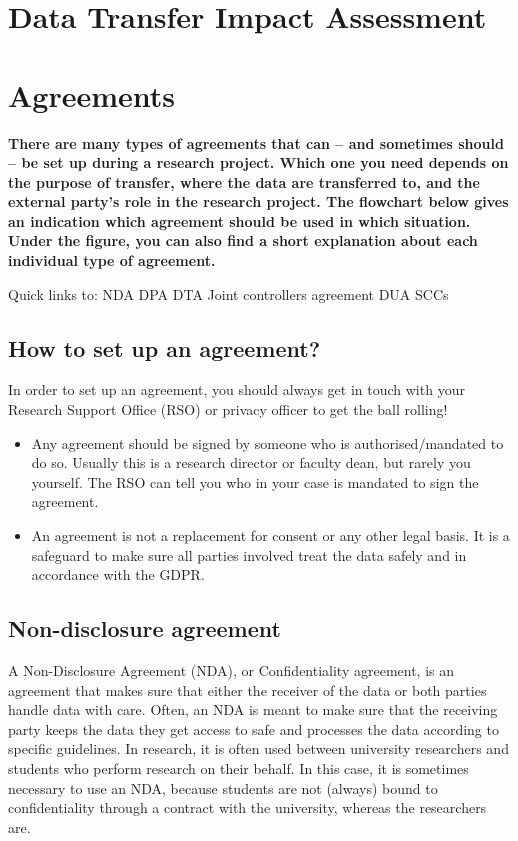\documentclass[
]{book}
\providecommand{\tightlist}{%
  \setlength{\itemsep}{0pt}\setlength{\parskip}{0pt}}
\begin{document}
\hypertarget{dtia}{%
\section{Data Transfer Impact Assessment}\label{dtia}}

\hypertarget{agreements}{%
\section{Agreements}\label{agreements}}

\textbf{There are many types of agreements that can -- and sometimes should -- be set up
during a research project. Which one you need depends on the purpose of transfer,
where the data are transferred to, and the external party's role in the research
project. The flowchart below gives an indication which agreement should be used
in which situation. Under the figure, you can also find a short explanation
about each individual type of agreement.}

Quick links to:
NDA
DPA
DTA
Joint controllers agreement
DUA
SCCs

\hypertarget{set-up-agreements}{%
\subsection{How to set up an agreement?}\label{set-up-agreements}}

In order to set up an agreement, you should always get in touch with your
Research Support Office
(RSO) or privacy officer
to get the ball rolling!

\begin{itemize}
\tightlist
\item
  Any agreement should be signed by someone who is authorised/mandated to do so.
  Usually this is a research director or faculty dean, but rarely you yourself.
  The RSO can tell you who in your case is mandated to sign the agreement.
\item
  An agreement is not a replacement for consent or any other
  legal basis. It is a safeguard to make sure all
  parties involved treat the data safely and in accordance with the GDPR.
\end{itemize}

\hypertarget{nda}{%
\subsection{Non-disclosure agreement}\label{nda}}

A Non-Disclosure Agreement (NDA), or Confidentiality agreement, is an agreement
that makes sure that either the receiver of the data or both parties handle
data with care. Often, an NDA is meant to make sure that the receiving party
keeps the data they get access to safe and processes the data according to
specific guidelines. In research, it is often used between university researchers
and students who perform research on their behalf. In this case, it is sometimes
necessary to use an NDA, because students are not (always) bound to
confidentiality through a contract with the university, whereas the researchers
are.
\end{document}
